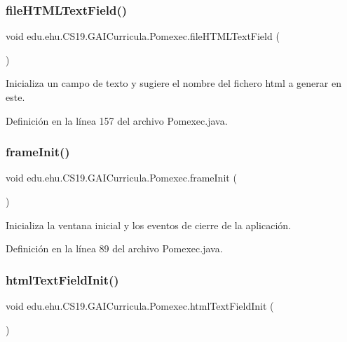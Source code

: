 \subsubsection{\texorpdfstring{fileHTMLTextField()}{fileHTMLTextField()}}
{\footnotesize\ttfamily void edu.\+ehu.\+C\+S19.\+G\+A\+I\+Curricula.\+Pomexec.\+file\+H\+T\+M\+L\+Text\+Field (\begin{DoxyParamCaption}{ }\end{DoxyParamCaption})}



Inicializa un campo de texto y sugiere el nombre del fichero html a generar en este. 



Definición en la línea 157 del archivo Pomexec.\+java.

\mbox{\label{a00028_a1542762d65badb0de4c9e00d793acd37}} 
\subsubsection{\texorpdfstring{frameInit()}{frameInit()}}
{\footnotesize\ttfamily void edu.\+ehu.\+C\+S19.\+G\+A\+I\+Curricula.\+Pomexec.\+frame\+Init (\begin{DoxyParamCaption}{ }\end{DoxyParamCaption})}



Inicializa la ventana inicial y los eventos de cierre de la aplicación. 



Definición en la línea 89 del archivo Pomexec.\+java.

\mbox{\label{a00028_aac5d95af4efdb3dc20e305283cedef95}} 
\subsubsection{\texorpdfstring{htmlTextFieldInit()}{htmlTextFieldInit()}}
{\footnotesize\ttfamily void edu.\+ehu.\+C\+S19.\+G\+A\+I\+Curricula.\+Pomexec.\+html\+Text\+Field\+Init (\begin{DoxyParamCaption}{ }\end{DoxyParamCaption})}



